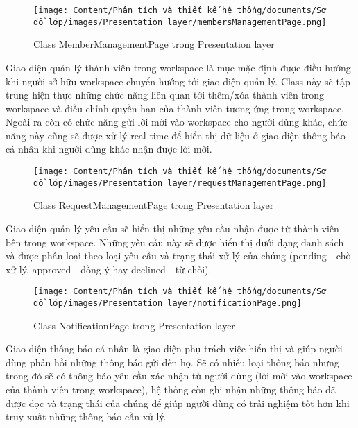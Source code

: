 \begin{figure}[H]
    \centering
    \texttt{[image: Content/Phân tích và thiết kế hệ thống/documents/Sơ đồ lớp/images/Presentation layer/membersManagementPage.png]}
    \vspace{0.5cm}
    \caption{Class MemberManagementPage trong Presentation layer}
    \label{fig:Class MemberManagementPage trong Presentation layer}
\end{figure}
Giao diện quản lý thành viên trong workspace là mục mặc định được điều hướng khi người sở hữu workspace chuyển hướng tới giao diện quản lý. Class này sẽ tập trung hiện thực những chức năng liên quan tới thêm/xóa thành viên trong workspace và điều chỉnh quyền hạn của thành viên tương ứng trong workspace. Ngoài ra còn có chức năng gửi lời mời vào workspace cho người dùng khác, chức năng này cũng sẽ được xử lý real-time để hiển thị dữ liệu ở giao diện thông báo cá nhân khi người dùng khác nhận được lời mời.

\begin{figure}[H]
    \centering
    \texttt{[image: Content/Phân tích và thiết kế hệ thống/documents/Sơ đồ lớp/images/Presentation layer/requestManagementPage.png]}
    \vspace{0.5cm}
    \caption{Class RequestManagementPage trong Presentation layer}
    \label{fig:Class RequestManagementPage trong Presentation layer}
\end{figure}
Giao diện quản lý yêu cầu sẽ hiển thị những yêu cầu nhận được từ thành viên bên trong workspace. Những yêu cầu này sẽ được hiển thị dưới dạng danh sách và được phân loại theo loại yêu cầu và trạng thái xử lý của chúng (pending - chờ xử lý, approved - đồng ý hay declined - từ chối).

\begin{figure}[H]
    \centering
    \texttt{[image: Content/Phân tích và thiết kế hệ thống/documents/Sơ đồ lớp/images/Presentation layer/notificationPage.png]}
    \vspace{0.5cm}
    \caption{Class NotificationPage trong Presentation layer}
    \label{fig:Class NotificationPage trong Presentation layer}
\end{figure}
Giao diện thông báo cá nhân là giao diện phụ trách việc hiển thị và giúp người dùng phản hồi những thông báo gửi đến họ. Sẽ có nhiều loại thông báo nhưng trong đó sẽ có thông báo yêu cầu xác nhận từ người dùng (lời mời vào workspace của thành viên trong workspace), hệ thống còn ghi nhận những thông báo đã được đọc và trạng thái của chúng để giúp người dùng có trải nghiệm tốt hơn khi truy xuất những thông báo cần xử lý.

